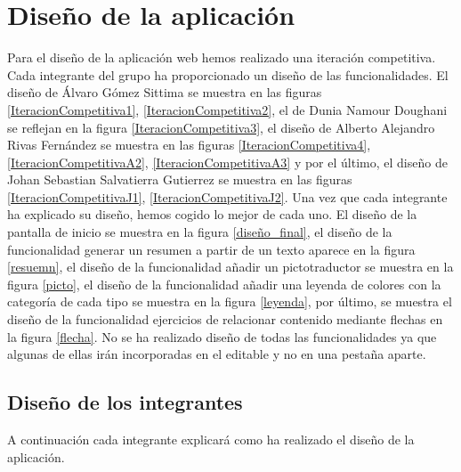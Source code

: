 \section{Diseño de la aplicación}
\label{disenyoDeLaAplicacion}
Para el diseño de la aplicación web hemos realizado una iteración competitiva. Cada integrante del grupo ha proporcionado un diseño de las funcionalidades. El diseño de Álvaro Gómez Sittima se muestra en las figuras \ref{IteracionCompetitiva1}, \ref{IteracionCompetitiva2}, el de Dunia Namour Doughani se reflejan en la figura \ref{IteracionCompetitiva3}, el diseño de Alberto Alejandro Rivas Fernández se muestra en las figuras \ref{IteracionCompetitiva4}, \ref{IteracionCompetitivaA2}, \ref{IteracionCompetitivaA3} y por el último, el diseño de Johan Sebastian Salvatierra Gutierrez se muestra en las figuras \ref{IteracionCompetitivaJ1}, \ref{IteracionCompetitivaJ2}. Una vez que cada integrante ha explicado su diseño, hemos cogido lo mejor de cada uno. El diseño de la pantalla de inicio se muestra en la figura \ref{diseño_final}, el diseño de la funcionalidad generar un resumen a partir de un texto aparece en la figura \ref{resuemn}, el diseño de la funcionalidad añadir un pictotraductor se muestra en la figura \ref{picto}, el diseño de la funcionalidad añadir una leyenda de colores con la categoría de cada tipo se muestra en la figura \ref{leyenda}, por último, se muestra el diseño de la funcionalidad ejercicios de relacionar contenido mediante flechas en la figura \ref{flecha}. No se ha realizado diseño de todas las funcionalidades ya que algunas de ellas irán incorporadas en el editable y no en una pestaña aparte.


\subsection{Diseño de los integrantes}
A continuación cada integrante explicará como ha realizado el diseño de la aplicación.

